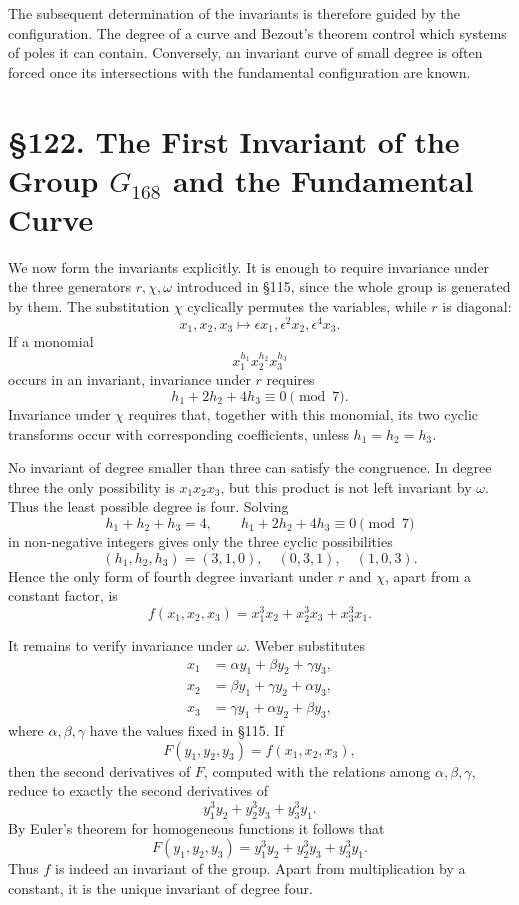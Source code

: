 \documentclass[11pt,a4paper]{book}
\newcommand{\webersection}[2]{\clearpage\section*{\S #1. #2}}
\begin{document}
The subsequent determination of the invariants is therefore guided by the configuration.  The degree of a curve and Bezout's theorem control which systems of poles it can contain.  Conversely, an invariant curve of small degree is often forced once its intersections with the fundamental configuration are known.

\webersection{122}{The First Invariant of the Group \(G_{168}\) and the Fundamental Curve}

We now form the invariants explicitly.  It is enough to require invariance under the three generators \(r,\chi,\omega\) introduced in \S 115, since the whole group is generated by them.  The substitution \(\chi\) cyclically permutes the variables, while \(r\) is diagonal:
\[
 x_1,x_2,x_3 \longmapsto
 \epsilon x_1,\epsilon^2x_2,\epsilon^4x_3.
\]
If a monomial
\[
 x_1^{h_1}x_2^{h_2}x_3^{h_3}
\]
occurs in an invariant, invariance under \(r\) requires
\[
 h_1+2h_2+4h_3\equiv0\pmod7.
\]
Invariance under \(\chi\) requires that, together with this monomial, its two cyclic transforms occur with corresponding coefficients, unless \(h_1=h_2=h_3\).

No invariant of degree smaller than three can satisfy the congruence.  In degree three the only possibility is \(x_1x_2x_3\), but this product is not left invariant by \(\omega\).  Thus the least possible degree is four.  Solving
\[
 h_1+h_2+h_3=4,
\qquad
 h_1+2h_2+4h_3\equiv0\pmod7
\]
in non-negative integers gives only the three cyclic possibilities
\[
 (h_1,h_2,h_3)=(3,1,0),\quad (0,3,1),\quad (1,0,3).
\]
Hence the only form of fourth degree invariant under \(r\) and \(\chi\), apart from a constant factor, is
\[
 f(x_1,x_2,x_3)=x_1^3x_2+x_2^3x_3+x_3^3x_1.
\]

It remains to verify invariance under \(\omega\).  Weber substitutes
\[
\begin{aligned}
 x_1&=\alpha y_1+\beta y_2+\gamma y_3,\\
 x_2&=\beta y_1+
       \gamma y_2+\alpha y_3,\\
 x_3&=\gamma y_1+\alpha y_2+\beta y_3,
\end{aligned}
\]
where \(\alpha,\beta,\gamma\) have the values fixed in \S 115.  If
\[
 F(y_1,y_2,y_3)=f(x_1,x_2,x_3),
\]
then the second derivatives of \(F\), computed with the relations among \(\alpha,\beta,\gamma\), reduce to exactly the second derivatives of
\[
 y_1^3y_2+y_2^3y_3+y_3^3y_1.
\]
By Euler's theorem for homogeneous functions it follows that
\[
 F(y_1,y_2,y_3)=y_1^3y_2+y_2^3y_3+y_3^3y_1.
\]
Thus \(f\) is indeed an invariant of the group.  Apart from multiplication by a constant, it is the unique invariant of degree four.
\end{document}
